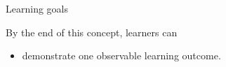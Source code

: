
\begin{frame}{Learning goals}
  \begin{LearningGoals}{By the end of this concept, learners can}
    \begin{itemize}
      \item demonstrate one observable learning outcome.
    \end{itemize}
  \end{LearningGoals}
\end{frame}
